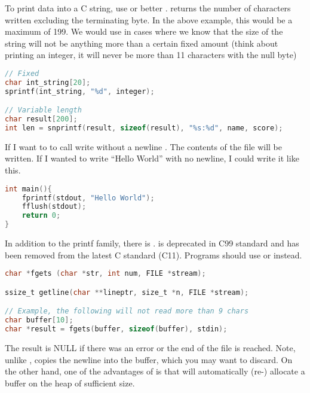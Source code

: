 To print data into a C string, use  or better .  returns the number of characters written excluding the terminating byte. In the above example, this would be a maximum of 199. We would use  in cases where we know that the size of the string will not be anything more than a certain fixed amount (think about printing an integer, it will never be more than 11 characters with the null byte)

\begin{lstlisting}[language=C]
// Fixed
char int_string[20];
sprintf(int_string, "%d", integer);

// Variable length
char result[200];
int len = snprintf(result, sizeof(result), "%s:%d", name, score);
\end{lstlisting}

If I want to  to call write without a newline . The contents of the file will be written. If I wanted to write ``Hello World'' with no newline, I could write it like this.

\begin{lstlisting}[language=C]
int main(){
    fprintf(stdout, "Hello World");
    fflush(stdout);
    return 0;
}
\end{lstlisting}

In addition to the printf family, there is .  is deprecated in C99 standard and has been removed from the latest C standard (C11). Programs should use  or  instead.

\begin{lstlisting}[language=C]
char *fgets (char *str, int num, FILE *stream); 

ssize_t getline(char **lineptr, size_t *n, FILE *stream);

// Example, the following will not read more than 9 chars
char buffer[10];
char *result = fgets(buffer, sizeof(buffer), stdin);
\end{lstlisting}

The result is NULL if there was an error or the end of the file is reached. Note, unlike ,  copies the newline into the buffer, which you may want to discard. On the other hand, one of the advantages of  is that will automatically (re-) allocate a buffer on the heap of sufficient size.

